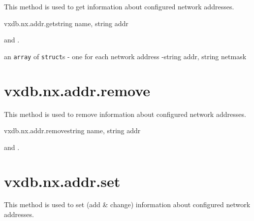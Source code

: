 This method is used to get information about configured network addresses.

\begin{rpcsynopsis}{vxdb.nx.addr.get}{string name, string addr}
\end{rpcsynopsis}

\begin{rpcaccess}
 and \rpcownerchecks.
\end{rpcaccess}

\begin{rpcreturncomplex}{an \texttt{array} of \texttt{struct}s - one for each
	network address -}{string addr, string netmask}
\end{rpcreturncomplex}

\rpcnoerrors


\section{vxdb.nx.addr.remove}

This method is used to remove information about configured network addresses.

\begin{rpcsynopsis}{vxdb.nx.addr.remove}{string name, string addr}
\end{rpcsynopsis}

\begin{rpcaccess}
 and \rpcownerchecks.
\end{rpcaccess}

\rpcreturnnil

\rpcnoerrors


\section{vxdb.nx.addr.set}

This method is used to set (add \& change) information about configured network
addresses.

